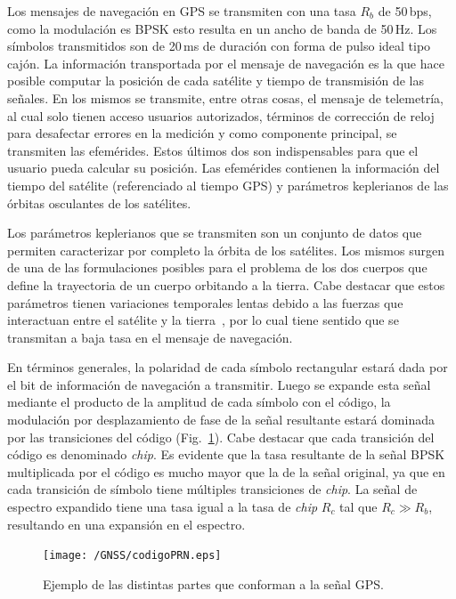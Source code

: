 \documentclass[a4paper,12pt,oneside,onecolumn,final,openright]{book}%
\begin{document}
	Los mensajes de navegación en GPS se transmiten con una tasa $R_b$ de 50\,bps, como la modulación es BPSK esto resulta en un ancho de banda de 50\,Hz. Los símbolos transmitidos son de 20\,ms de duración con forma de pulso ideal tipo cajón. La información transportada por el mensaje de navegación es la que hace posible computar la posición de cada satélite y tiempo de transmisión de las señales. En los mismos se transmite, entre otras cosas, el mensaje de telemetría, al cual solo tienen acceso usuarios autorizados, términos de corrección de reloj para desafectar errores en la medición y como componente principal, se transmiten las efemérides. Estos últimos dos son indispensables para que el usuario pueda calcular su posición. Las efemérides contienen la información del tiempo del satélite (referenciado al tiempo GPS) y parámetros keplerianos de las órbitas osculantes de los satélites.
	
	Los parámetros keplerianos que se transmiten son un conjunto de datos que permiten caracterizar por completo la órbita de los satélites. Los mismos surgen de una de las formulaciones posibles para el problema de los dos cuerpos que define la trayectoria de un cuerpo orbitando a la tierra. Cabe destacar que estos parámetros tienen variaciones temporales lentas debido a las fuerzas que interactuan entre el satélite y la tierra~\cite{kaplan}, por lo cual tiene sentido que se transmitan a baja tasa en el mensaje de navegación.
	
	En términos generales, la polaridad de cada símbolo rectangular estará dada por el bit de información de navegación a transmitir. Luego se expande esta señal mediante el producto de la amplitud de cada símbolo con el código, la modulación por desplazamiento de fase de la señal resultante estará dominada por las transiciones del código (Fig.~\ref{fig:PRN}). Cabe destacar que cada transición del código es denominado \textit{chip}. Es evidente que la tasa resultante de la señal BPSK multiplicada por el código es mucho mayor que la de la señal original, ya que en cada transición de símbolo tiene múltiples transiciones de \textit{chip}. La señal de espectro expandido tiene una tasa igual a la tasa de \textit{chip} $R_c$ tal que $R_c \gg R_b$, resultando en una expansión en el espectro.
\begin{figure}%
    \centering
    \texttt{[image: /GNSS/codigoPRN.eps]}
    \caption{Ejemplo de las distintas partes que conforman a la señal GPS.}
    \label{fig:PRN}
\end{figure}
\end{document}

